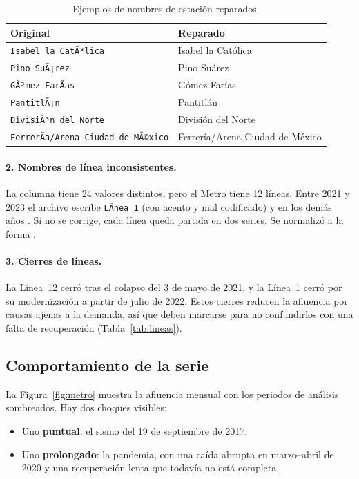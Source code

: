 \begin{table}[h]
\centering
\caption{Ejemplos de nombres de estación reparados.}\label{tab:mojibake}
\small
\begin{tabular}{ll}
\toprule
\textbf{Original} & \textbf{Reparado}\\
\midrule
\texttt{Isabel la CatÃ³lica} & Isabel la Católica\\
\texttt{Pino SuÃ¡rez} & Pino Suárez\\
\texttt{GÃ³mez FarÃas} & Gómez Farías\\
\texttt{PantitlÃ¡n} & Pantitlán\\
\texttt{DivisiÃ³n del Norte} & División del Norte\\
\texttt{FerrerÃa/Arena Ciudad de MÃ©xico} & Ferrería/Arena Ciudad de México\\
\bottomrule
\end{tabular}
\end{table}

\paragraph{2. Nombres de línea inconsistentes.} La columna  tiene 24 valores
distintos, pero el Metro tiene 12 líneas. Entre 2021 y 2023 el archivo escribe
\texttt{LÃnea 1} (con acento y mal codificado) y en los demás años . Si no se
corrige, cada línea queda partida en dos series. Se normalizó a la forma .

\paragraph{3. Cierres de líneas.} La Línea~12 cerró tras el colapso del 3 de mayo de 2021, y la
Línea~1 cerró por su modernización a partir de julio de 2022. Estos cierres reducen la afluencia por
causas ajenas a la demanda, así que deben marcarse para no confundirlos con una falta de
recuperación (Tabla~\ref{tab:lineas}).

\subsection{Comportamiento de la serie}
La Figura~\ref{fig:metro} muestra la afluencia mensual con los periodos de análisis sombreados. Hay
dos choques visibles:
\begin{itemize}
  \item Uno \textbf{puntual}: el sismo del 19 de septiembre de 2017.
  \item Uno \textbf{prolongado}: la pandemia, con una caída abrupta en marzo--abril de 2020 y una
        recuperación lenta que todavía no está completa.
\end{itemize}

